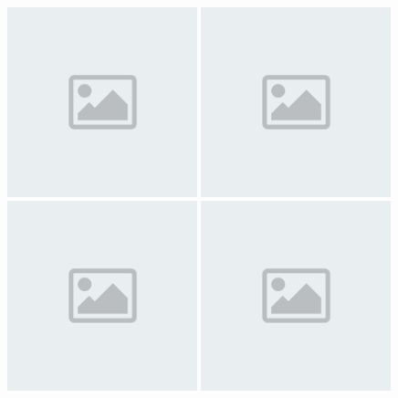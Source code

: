 \begin{figure}[hbtp]\begin{center}
\includegraphics[width=0.49\textwidth]{placeholder.png}
\includegraphics[width=0.49\textwidth]{placeholder.png}
\\
\includegraphics[width=0.49\textwidth]{placeholder.png}
\includegraphics[width=0.49\textwidth]{placeholder.png}

\end{center}
\end{figure}
